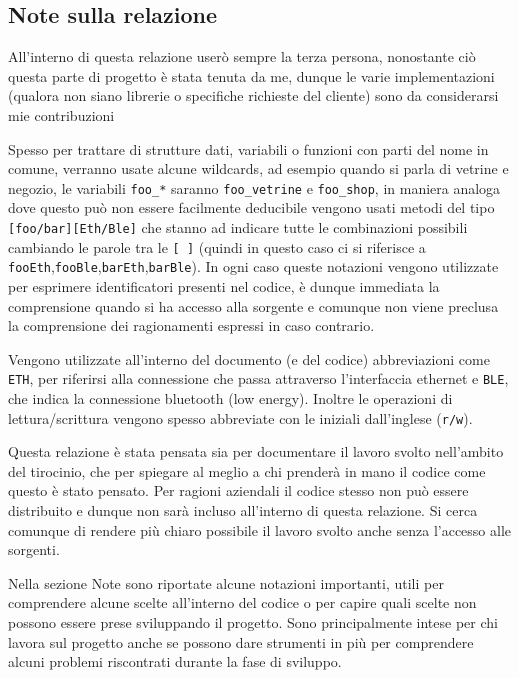 \documentclass[a4paper,12pt]{article}
\begin{document}
\begin{em}

  \subsection{Note sulla relazione}

  All'interno di questa relazione user\`o sempre la terza persona, nonostante ci\`o questa parte di progetto \`e stata tenuta da me, dunque le varie implementazioni (qualora non siano librerie o specifiche richieste del cliente) sono da considerarsi mie contribuzioni

  Spesso per trattare di strutture dati, variabili o funzioni con parti del nome in comune, verranno usate alcune \textup{wildcards}, ad esempio quando si parla di vetrine e negozio, le variabili \textup{\texttt{foo\_*}} saranno \textup{\texttt{foo\_vetrine}} e \textup{\texttt{foo\_shop}}, in maniera analoga dove questo pu\`o non essere facilmente deducibile vengono usati metodi del tipo \textup{\texttt{[foo/bar][Eth/Ble]}} che stanno ad indicare tutte le combinazioni possibili cambiando le parole tra le \textup{\texttt{[ ]}} (quindi in questo caso ci si riferisce a \textup{\texttt{fooEth}},\textup{\texttt{fooBle}},\textup{\texttt{barEth}},\textup{\texttt{barBle}}). In ogni caso queste notazioni vengono utilizzate per esprimere identificatori presenti nel codice, \`e dunque immediata la comprensione quando si ha accesso alla sorgente e comunque non viene preclusa la comprensione dei ragionamenti espressi in caso contrario.

  Vengono utilizzate all'interno del documento (e del codice) abbreviazioni come \textup{\texttt{ETH}}, per riferirsi alla connessione che passa attraverso l'interfaccia ethernet e \textup{\texttt{BLE}}, che indica la connessione bluetooth (low energy). Inoltre le operazioni di lettura/scrittura vengono spesso abbreviate con le iniziali dall'inglese (\textup{\texttt{r/w}}).

  Questa relazione \`e stata pensata sia per documentare il lavoro svolto nell'ambito del tirocinio, che per spiegare al meglio a chi prender\`a in mano il codice come questo \`e stato pensato. Per ragioni aziendali il codice stesso non pu\`o essere distribuito e dunque non sar\`a incluso all'interno di questa relazione. Si cerca comunque di rendere pi\`u chiaro possibile il lavoro svolto anche senza l'accesso alle sorgenti.

  Nella sezione \textup{Note} sono riportate alcune notazioni importanti, utili per comprendere alcune scelte all'interno del codice o per capire quali scelte non possono essere prese sviluppando il progetto. Sono principalmente intese per chi lavora sul progetto anche se possono dare strumenti in pi\`u per comprendere alcuni problemi riscontrati durante la fase di sviluppo.

\end{em}
\end{document}
